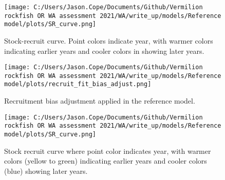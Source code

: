\documentclass[11pt,
  english,
  a4paper,
]{article}
\begin{document}
\tagmcend\tagstructend


\begin{figure}
\centering
\texttt{[image: C:/Users/Jason.Cope/Documents/Github/Vermilion rockfish OR WA assessment 2021/WA/write\_up/models/Reference model/plots/SR\_curve.png]}
\caption{Stock-recruit curve. Point colors indicate year, with warmer colors indicating earlier years and cooler colors in showing later years.\label{fig:bh-curve}}
\end{figure}

\tagmcend\tagstructend


\begin{figure}
\centering
\texttt{[image: C:/Users/Jason.Cope/Documents/Github/Vermilion rockfish OR WA assessment 2021/WA/write\_up/models/Reference model/plots/recruit\_fit\_bias\_adjust.png]}
\caption{Recruitment bias adjustment applied in the reference model.\label{fig:bias-adj}}
\end{figure}

\tagmcend\tagstructend


\begin{figure}
\centering
\texttt{[image: C:/Users/Jason.Cope/Documents/Github/Vermilion rockfish OR WA assessment 2021/WA/write\_up/models/Reference model/plots/SR\_curve.png]}
\caption{Stock recruit curve where point color indicates year, with warmer colors (yellow to green) indicating earlier years and cooler colors (blue) showing later years.\label{fig:sr-curve}}
\end{figure}

\tagmcend\tagstructend

\end{document}
